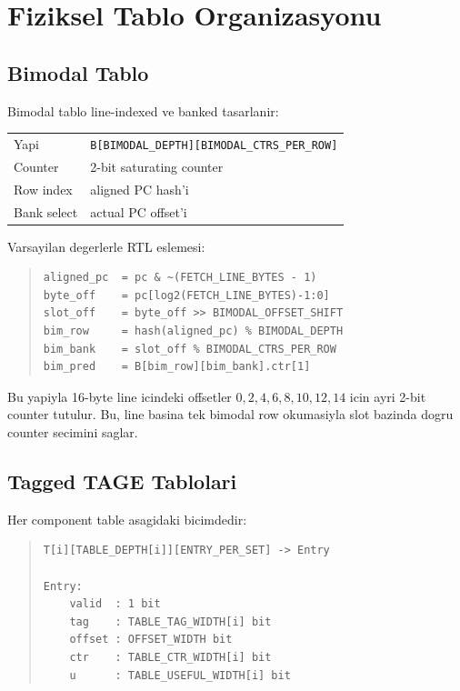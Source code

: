 \documentclass[11pt,a4paper]{article}
\newcommand{\code}[1]{\texttt{#1}}
\begin{document}
\section{Fiziksel Tablo Organizasyonu}

\subsection{Bimodal Tablo}

Bimodal tablo line-indexed ve banked tasarlanir:

\begin{center}
\begin{tabular}{ll}
\toprule
Yapi & \code{B[BIMODAL\_DEPTH][BIMODAL\_CTRS\_PER\_ROW]} \\
Counter & 2-bit saturating counter \\
Row index & aligned PC hash'i \\
Bank select & actual PC offset'i \\
\bottomrule
\end{tabular}
\end{center}

Varsayilan degerlerle RTL eslemesi:

\begin{quote}
\footnotesize
\begin{verbatim}
aligned_pc  = pc & ~(FETCH_LINE_BYTES - 1)
byte_off    = pc[log2(FETCH_LINE_BYTES)-1:0]
slot_off    = byte_off >> BIMODAL_OFFSET_SHIFT
bim_row     = hash(aligned_pc) % BIMODAL_DEPTH
bim_bank    = slot_off % BIMODAL_CTRS_PER_ROW
bim_pred    = B[bim_row][bim_bank].ctr[1]
\end{verbatim}
\end{quote}

Bu yapiyla 16-byte line icindeki offsetler
$0,2,4,6,8,10,12,14$ icin ayri 2-bit counter tutulur. Bu, line basina tek
bimodal row okumasiyla slot bazinda dogru counter secimini saglar.

\subsection{Tagged TAGE Tablolari}

Her component table asagidaki bicimdedir:

\begin{quote}
\footnotesize
\begin{verbatim}
T[i][TABLE_DEPTH[i]][ENTRY_PER_SET] -> Entry

Entry:
    valid  : 1 bit
    tag    : TABLE_TAG_WIDTH[i] bit
    offset : OFFSET_WIDTH bit
    ctr    : TABLE_CTR_WIDTH[i] bit
    u      : TABLE_USEFUL_WIDTH[i] bit
\end{verbatim}
\end{quote}
\end{document}
